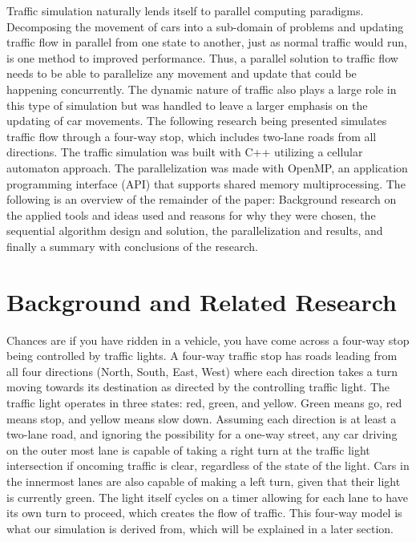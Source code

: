 \documentclass[conference]{IEEEtran}
\begin{document}
Traffic simulation naturally lends itself to parallel computing paradigms. Decomposing the movement of cars into a sub-domain of problems and updating traffic flow in parallel from one state to another, just as normal traffic would run, is one method to improved performance. 
Thus, a parallel solution to traffic flow needs to be able to parallelize any movement and update that could be happening concurrently. The dynamic nature of traffic also plays a large role in this type of simulation but was handled to leave a larger emphasis on the updating of car movements. The following research being presented simulates traffic flow through a four-way stop, which includes two-lane roads from all directions. The traffic simulation was built with C++ utilizing a cellular automaton approach.  The parallelization was made with OpenMP, an application programming interface (API) that supports shared memory multiprocessing. The following is an overview of the remainder of the paper: Background research on the applied tools and ideas used and reasons for why they were chosen, the sequential algorithm design and solution, the parallelization and results, and finally a summary with conclusions of the research.
 \\


\section{Background and Related Research}
Chances are if you have ridden in a vehicle, you have come across a four-way stop being controlled by traffic lights. A four-way traffic stop has roads leading from all four directions (North, South, East, West) where each direction takes a turn moving towards its destination as directed by the controlling traffic light. The traffic light operates in three states: red, green, and yellow. Green means go, red means stop, and yellow means slow down. Assuming each direction is at least a two-lane road, and ignoring the possibility for a one-way street, any car driving on the outer most lane is capable of taking a right turn at the traffic light intersection if oncoming traffic is clear, regardless of the state of the light. Cars in the innermost lanes are also capable of making a left turn, given that their light is currently green. The light itself cycles on a timer allowing for each lane to have its own turn to proceed, which creates the flow of traffic. This four-way model is what our simulation is derived from, which will be explained in a later section. \\
\end{document}
